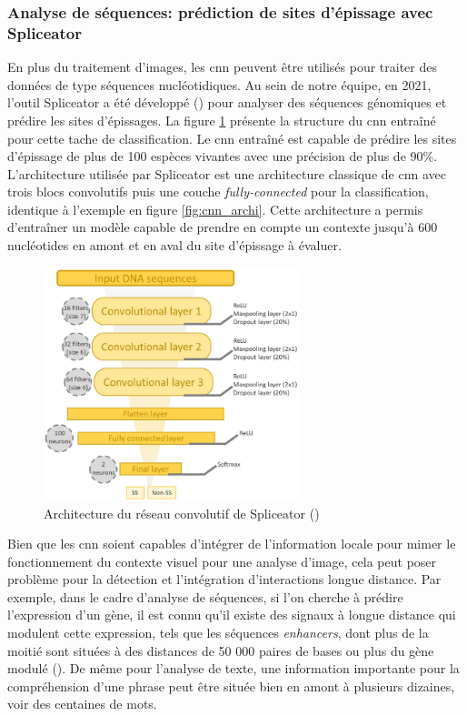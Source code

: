 \subsubsection{Analyse de séquences: prédiction de sites d'épissage avec Spliceator}
En plus du traitement d'images, les \gls{cnn} peuvent être utilisés pour traiter des données de type séquences nucléotidiques. Au sein de notre équipe, en 2021, l'outil Spliceator a été développé (\cite{scalzitti_spliceator_2021}) pour analyser des séquences génomiques et prédire les sites d'épissages. La figure \ref{fig:splice_archi} présente la structure du \gls{cnn} entraîné pour cette tache de classification. Le \gls{cnn} entraîné est capable de prédire les sites d'épissage de plus de 100 espèces vivantes avec une précision de plus de 90\%. L'architecture utilisée par Spliceator est une architecture classique de \gls{cnn} avec trois blocs convolutifs puis une couche \textit{fully-connected} pour la classification, identique à l'exemple en figure \ref{fig:cnn_archi}. Cette architecture a permis d'entraîner un modèle capable de prendre en compte un contexte jusqu'à 600 nucléotides en amont et en aval du site d'épissage à évaluer.
\begin{figure}[!ht]
 \centering
 \includegraphics[width=0.66\textwidth]{figures/spliceator_nn.png}
 \caption[Architecture du réseau convolutionel de Spliceator]{Architecture du réseau convolutif de Spliceator (\cite{scalzitti_spliceator_2021})}
 \label{fig:splice_archi}
\end{figure}

Bien que les \gls{cnn} soient capables d'intégrer de l'information locale pour mimer le fonctionnement du contexte visuel pour une analyse d'image, cela peut poser problème pour la détection et l'intégration d'interactions longue distance. Par exemple, dans le cadre d'analyse de séquences, si l’on cherche à prédire l'expression d'un gène, il est connu qu'il existe des signaux à longue distance qui modulent cette expression, tels que les séquences \textit{enhancers}, dont plus de la moitié sont situées à des distances de 50 000 paires de bases ou plus du gène modulé (\cite{chepelev_characterization_2012}). De même pour l'analyse de texte, une information importante pour la compréhension d'une phrase peut être située bien en amont à plusieurs dizaines, voir des centaines de mots.


